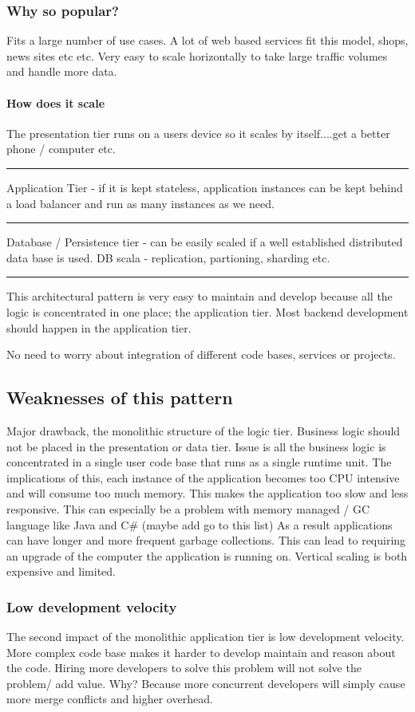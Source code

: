 \subsubsection{Why so popular?}
Fits a large number of use cases.
A lot of web based services fit this model, shops, news sites etc etc.
Very easy to scale horizontally to take large traffic volumes and handle more data.

\paragraph{How does it scale}
The presentation tier runs on a users device so it scales by itself....get a better phone / computer etc.
\hrule
Application Tier - if it is kept stateless, application instances can be kept behind a load balancer and run as many instances as we need.
\hrule
Database / Persistence tier - can be easily scaled if a well established distributed data base is used. DB scala - replication, partioning, sharding etc.

\hrule
This architectural pattern is very easy to maintain and develop because all the logic is concentrated in one place; the application tier.
Most backend development should happen in the application tier.

No need to worry about integration of different code bases, services or projects.

\subsection{Weaknesses of this pattern}

Major drawback, the monolithic structure of the logic tier.
Business logic should not be placed in the presentation or data tier.
Issue is all the business logic is concentrated in a single user code base that runs as a single runtime unit.
The implications of this, each instance of the application becomes too CPU intensive and will consume too much memory.
This makes the application too slow and less responsive.
This can especially be a problem with memory managed / GC language like Java and C\# (maybe add go to this list)
As a result applications can have longer and more frequent garbage collections.
This can lead to requiring an upgrade of the computer the application is running on.
Vertical scaling is both expensive and limited.

\subsubsection{Low development velocity}
The second impact of the monolithic application tier is low development velocity.
More complex code base makes it harder to develop maintain and reason about the code.
Hiring more developers to solve this problem will not solve the problem/ add value.
Why?
Because more concurrent developers will simply cause more merge conflicts and higher overhead.

